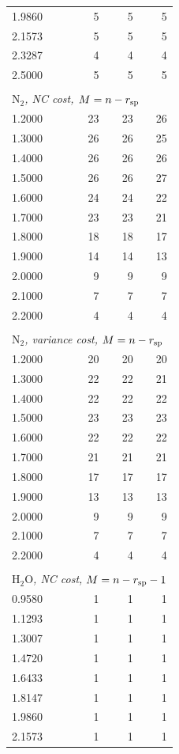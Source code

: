 \begin{longtable}{lrrr}
1.9860 & 5 & 5 & 5\\
2.1573 & 5 & 5 & 5\\
2.3287 & 4 & 4 & 4\\
2.5000 & 5 & 5 & 5\\
\multicolumn{4}{l}{}\\
\multicolumn{4}{l}{\emph{$\mathrm{N_2}$, NC cost, $M=n-r_{\mathrm{sp}}$}}\\
\hline
1.2000 & 23 & 23 & 26\\
1.3000 & 26 & 26 & 25\\
1.4000 & 26 & 26 & 26\\
1.5000 & 26 & 26 & 27\\
1.6000 & 24 & 24 & 22\\
1.7000 & 23 & 23 & 21\\
1.8000 & 18 & 18 & 17\\
1.9000 & 14 & 14 & 13\\
2.0000 & 9 & 9 & 9\\
2.1000 & 7 & 7 & 7\\
2.2000 & 4 & 4 & 4\\
\multicolumn{4}{l}{}\\
\multicolumn{4}{l}{\emph{$\mathrm{N_2}$, variance cost, $M=n-r_{\mathrm{sp}}$}}\\
\hline
1.2000 & 20 & 20 & 20\\
1.3000 & 22 & 22 & 21\\
1.4000 & 22 & 22 & 22\\
1.5000 & 23 & 23 & 23\\
1.6000 & 22 & 22 & 22\\
1.7000 & 21 & 21 & 21\\
1.8000 & 17 & 17 & 17\\
1.9000 & 13 & 13 & 13\\
2.0000 & 9 & 9 & 9\\
2.1000 & 7 & 7 & 7\\
2.2000 & 4 & 4 & 4\\
\multicolumn{4}{l}{}\\
\multicolumn{4}{l}{\emph{$\mathrm{H_2O}$, NC cost, $M=n-r_{\mathrm{sp}}-1$}}\\
\hline
0.9580 & 1 & 1 & 1\\
1.1293 & 1 & 1 & 1\\
1.3007 & 1 & 1 & 1\\
1.4720 & 1 & 1 & 1\\
1.6433 & 1 & 1 & 1\\
1.8147 & 1 & 1 & 1\\
1.9860 & 1 & 1 & 1\\
2.1573 & 1 & 1 & 1\\

\end{longtable}
